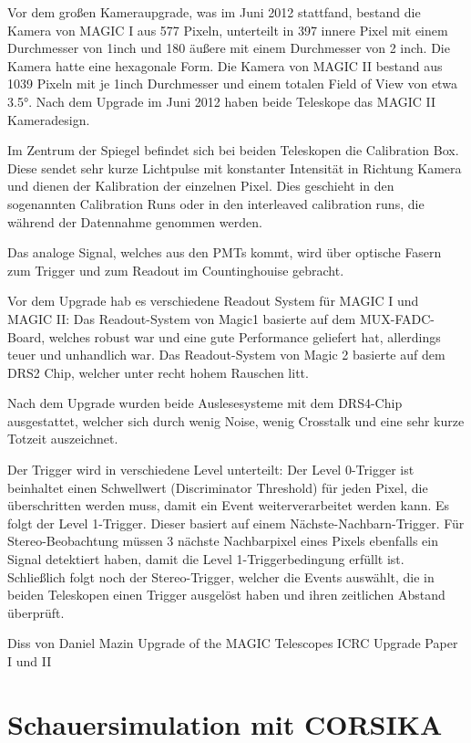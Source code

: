 Vor dem großen Kameraupgrade, was im Juni 2012 stattfand, bestand die Kamera von MAGIC I aus 577 Pixeln, unterteilt in 397 innere Pixel mit einem Durchmesser von 1inch und 180 äußere mit einem Durchmesser von 2 inch.
Die Kamera hatte eine hexagonale Form.
Die Kamera von MAGIC II bestand aus 1039 Pixeln mit je 1inch Durchmesser und einem totalen Field of View von etwa 3.5°.
Nach dem Upgrade im Juni 2012 haben beide Teleskope das MAGIC II Kameradesign.

Im Zentrum der Spiegel befindet sich bei beiden Teleskopen die Calibration Box.
Diese sendet sehr kurze Lichtpulse mit konstanter Intensität in Richtung Kamera und dienen der Kalibration der einzelnen Pixel.
Dies geschieht in den sogenannten Calibration Runs oder in den interleaved calibration runs, die während der Datennahme genommen werden.

Das analoge Signal, welches aus den PMTs kommt, wird über optische Fasern zum Trigger und zum Readout im Countinghouise gebracht.

Vor dem Upgrade hab es verschiedene Readout System für MAGIC I und MAGIC II:
Das Readout-System von Magic1 basierte auf dem MUX-FADC-Board, welches robust war und eine gute Performance geliefert hat, allerdings teuer und unhandlich war.
Das Readout-System von Magic 2 basierte auf dem DRS2 Chip, welcher unter recht hohem Rauschen litt.

Nach dem Upgrade wurden beide Auslesesysteme mit dem DRS4-Chip ausgestattet, welcher sich durch wenig Noise, wenig Crosstalk und eine sehr kurze Totzeit auszeichnet.

Der Trigger wird in verschiedene Level unterteilt:
Der Level 0-Trigger ist beinhaltet einen Schwellwert (Discriminator Threshold) für jeden Pixel, die überschritten werden muss, damit ein Event weiterverarbeitet werden kann.
Es folgt der Level 1-Trigger. Dieser basiert auf einem Nächste-Nachbarn-Trigger. 
Für Stereo-Beobachtung müssen 3 nächste Nachbarpixel eines Pixels ebenfalls ein Signal detektiert haben, damit die Level 1-Triggerbedingung erfüllt ist.
Schließlich folgt noch der Stereo-Trigger, welcher die Events auswählt, die in beiden Teleskopen einen Trigger ausgelöst haben und ihren zeitlichen Abstand überprüft.

Diss von Daniel Mazin
Upgrade of the MAGIC Telescopes ICRC
Upgrade Paper I und II


\section{Schauersimulation mit CORSIKA}
\label{sec:Corsika}

